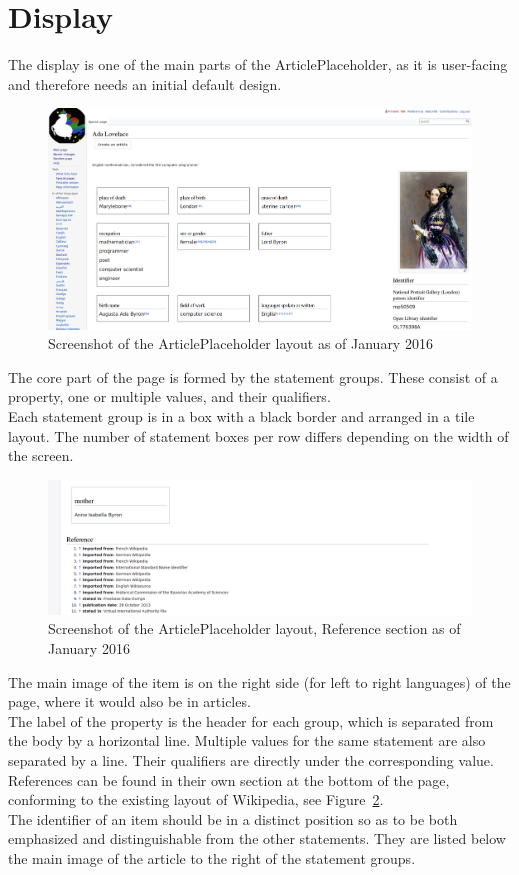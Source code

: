 \newpage
\section{Display}
	The display is one of the main parts of the ArticlePlaceholder, as it is user-facing and therefore needs an initial default design. \\
	\begin{figure}[H]
		\centering
		\includegraphics[width=\textwidth]{diagrams/Screenshot-ArticlePlaceholder.png}
		\caption{Screenshot of the ArticlePlaceholder layout as of January 2016}
		\label{screenshot}
	\end{figure}
	The core part of the page is formed by the statement groups. These consist of a property, one or multiple values, and their qualifiers. \\
	Each statement group is in a box with a black border and arranged in a tile layout. The number of statement boxes per row differs depending on the width of the screen. \\
	\begin{figure}[H]
		\centering
		\includegraphics[width=\textwidth]{diagrams/references.png}
		\caption{Screenshot of the ArticlePlaceholder layout, Reference section as of January 2016}
		\label{fig:references}
	\end{figure}
	The main image of the item is on the right side (for left to right languages) of the page, where it would also be in articles.\\
	The label of the property is the header for each group, which is separated from the body by a horizontal line. Multiple values for the same statement are also separated by a line. Their qualifiers are directly under the corresponding value. \\
	References can be found in their own section at the bottom of the page, conforming to the existing layout of Wikipedia, see Figure~\ref{fig:references}. \\
	The identifier of an item should be in a distinct position so as to be both emphasized and distinguishable from the other statements. They are listed below the main image of the article to the right of the statement groups.
	
	
	
	
	